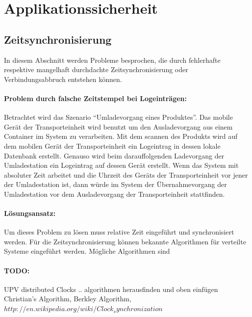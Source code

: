 \section{Applikationssicherheit}

\subsection{Zeitsynchronisierung}

In diesem Abschnitt werden Probleme besprochen, die durch fehlerhafte respektive
mangelhaft durchdachte Zeitsynchronisierung oder Verbindungsabbruch entstehen
können.


\paragraph{Problem durch falsche Zeitstempel bei Logeinträgen:}
Betrachtet wird das Szenario ``Umladevorgang eines Produktes''. Das mobile
Gerät der Transporteinheit wird benutzt um den Ausladevorgang aus einem
Container im System zu verarbeiten. Mit dem scannen des Produkts wird auf dem
mobilen Gerät der Transporteinheit ein Logeintrag in dessen lokale Datenbank
erstellt. Genauso wird beim darauffolgenden Ladevorgang der Umladestation ein
Logeintrag auf dessen Gerät erstellt. Wenn das System mit absoluter Zeit
arbeitet und die Uhrzeit des Geräts der Transporteinheit vor jener der
Umladestation ist, dann würde im System der Übernahmevorgang der Umladestation
vor dem Ausladevorgang der Transporteinheit stattfinden.
\par
\paragraph{Lösungsansatz:}
Um dieses Problem zu lösen muss relative Zeit eingeführt und synchronisiert
werden. Für die Zeitsynchronisierung können bekannte Algorithmen für verteilte
Systeme eingeführt werden. Mögliche Algorithmen sind
\par

\paragraph{TODO:}
UPV distributed Clocks .. algorithmen herausfinden und oben einfügen\\ 

	Christian's Algorithm, Berkley Algorithm, 
	$http://en.wikipedia.org/wiki/Clock_synchronization$
\par

